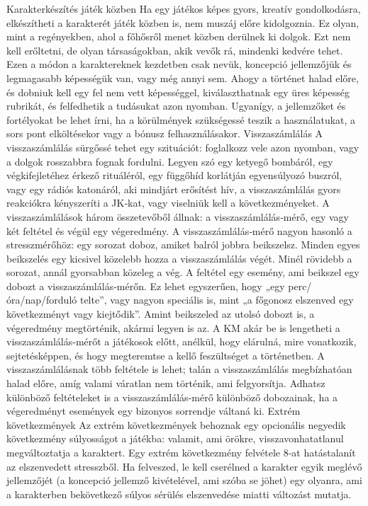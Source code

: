 \documentclass[oneside]{book}
\begin{document}
Karakterkészítés játék közben
Ha egy játékos képes gyors, kreatív gondolkodásra, elkészítheti a karakterét játék közben is, nem muszáj előre kidolgoznia. Ez olyan, mint a regényekben, ahol a főhősről menet közben derülnek ki dolgok. Ezt nem kell erőltetni, de olyan társaságokban, akik vevők rá, mindenki kedvére tehet.
Ezen a módon a karaktereknek kezdetben csak nevük, koncepció jellemzőjük és legmagasabb képességük van, vagy még annyi sem. Ahogy a történet halad előre, és dobniuk kell egy fel nem vett képességgel, kiválaszthatnak egy üres képesség rubrikát, és felfedhetik a tudásukat azon nyomban. Ugyanígy, a jellemzőket és fortélyokat be lehet írni, ha a körülmények szükségessé teszik a használatukat, a sors pont elköltésekor vagy a bónusz felhasználásakor.
Visszaszámlálás
A visszaszámlálás sürgőssé tehet egy szituációt: foglalkozz vele azon nyomban, vagy a dolgok rosszabbra fognak fordulni. Legyen szó egy ketyegő bombáról, egy végkifejletéhez érkező rituáléról, egy függőhíd korlátján egyensúlyozó buszról, vagy egy rádiós katonáról, aki mindjárt erősítést hív, a visszaszámlálás gyors reakciókra kényszeríti a JK‑kat, vagy viselniük kell a következményeket.
A visszaszámlálások három összetevőből állnak: a visszaszámlálás‑mérő, egy vagy két feltétel és végül egy végeredmény.
A visszaszámlálás‑mérő nagyon hasonló a stresszmérőhöz: egy sorozat doboz, amiket balról jobbra beikszelsz. Minden egyes beikszelés egy kicsivel közelebb hozza a visszaszámlálás végét. Minél rövidebb a sorozat, annál gyorsabban közeleg a vég.
A feltétel egy esemény, ami beikszel egy dobozt a visszaszámlálás‑mérőn. Ez lehet egyszerűen, hogy „egy perc/óra/nap/forduló telte”, vagy nagyon speciális is, mint „a főgonosz elszenved egy következményt vagy kiejtődik”.
Amint beikszeled az utolsó dobozt is, a végeredmény megtörténik, akármi legyen is az.
A KM akár be is lengetheti a visszaszámlálás‑mérőt a játékosok előtt, anélkül, hogy elárulná, mire vonatkozik, sejtetésképpen, és hogy megteremtse a kellő feszültséget a történetben.
A visszaszámlálásnak több feltétele is lehet; talán a visszaszámlálás megbízhatóan halad előre, amíg valami váratlan nem történik, ami felgyorsítja. Adhatsz különböző feltételeket is a visszaszámlálás‑mérő különböző dobozainak, ha a végeredményt események egy bizonyos sorrendje váltaná ki.
Extrém következmények
Az extrém következmények behoznak egy opcionális negyedik következmény súlyosságot a játékba: valamit, ami örökre, visszavonhatatlanul megváltoztatja a karaktert.
Egy extrém következmény felvétele 8‑at hatástalanít az elszenvedett stresszből. Ha felveszed, le kell cserélned a karakter egyik meglévő jellemzőjét (a koncepció jellemző kivételével, ami szóba se jöhet) egy olyanra, ami a karakterben bekövetkező súlyos sérülés elszenvedése miatti változást mutatja.
\end{document}
